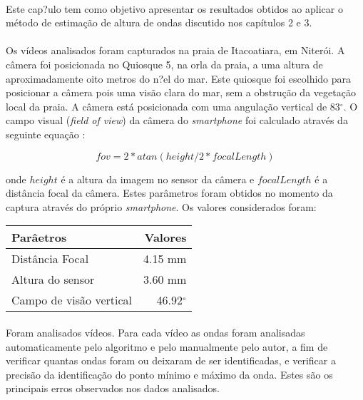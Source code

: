 \paragraph{}Este cap?ulo tem como objetivo apresentar os resultados obtidos ao aplicar o método de estimação de altura de ondas discutido nos capítulos 2 e 3. 

\paragraph{}Os vídeos analisados foram capturados na praia de Itacoatiara, em Niterói. A câmera foi posicionada no Quiosque 5, na orla da praia, a uma altura de aproximadamente oito metros do n?el do mar. Este quiosque foi escolhido para posicionar a câmera pois uma visão clara do mar, sem a obstrução da vegetação local da praia. A câmera está posicionada com uma angulação vertical de 83$^{\circ}$. O campo visual (\textit{field of view}) da câmera do \textit{smartphone} foi calculado através da seguinte equação \cite{Bourke}: 

\[
	fov = 2 * atan(height/2*focalLength)
\]

\noindent{}onde $height$ é a altura da imagem no sensor da câmera e $focalLength$ é a distância focal da câmera. Estes parâmetros foram obtidos no momento da captura através do próprio \textit{smartphone}. Os valores considerados foram:

\begin{center}
    \begin{tabular}{| l | r |}
    \hline
    Parâetros & Valores \\ \hline
    Distância Focal & 4.15 mm\\ \hline
    Altura do sensor & 3.60 mm\\ \hline
    Campo de visão vertical & 46.92$^{\circ}$ \\ 
    \hline
    \end{tabular}
\end{center}

\paragraph{}Foram analisados  vídeos. Para cada vídeo as ondas foram analisadas automaticamente pelo algoritmo e pelo manualmente pelo autor, a fim de verificar quantas ondas foram ou deixaram de ser identificadas, e verificar a precisão da identificação do ponto mínimo e máximo da onda. Estes são os principais erros observados nos dados analisados. 

